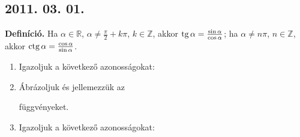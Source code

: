 \subsection*{2011. 03. 01.}
\textbf{Definíció.} Ha $\alpha\in\mathbb R$, $\alpha\ne\frac{\pi}{2}+k\pi$, $k\in\mathbb Z$, akkor $\mathop{\mathrm{tg}}\nolimits\alpha=\frac{\sin\alpha}{\cos\alpha}$; ha $\alpha\ne n\pi$, $n\in\mathbb{Z}$, akkor $\mathop{\mathrm{ctg}}\nolimits\alpha=\frac{\cos\alpha}{\sin\alpha}$.
\begin{enumerate}
\item Igazoljuk a következő azonosságokat:
\item Ábrázoljuk és jellemezzük az
függvényeket.
\item Igazoljuk a következő azonosságokat:
\end{enumerate}

